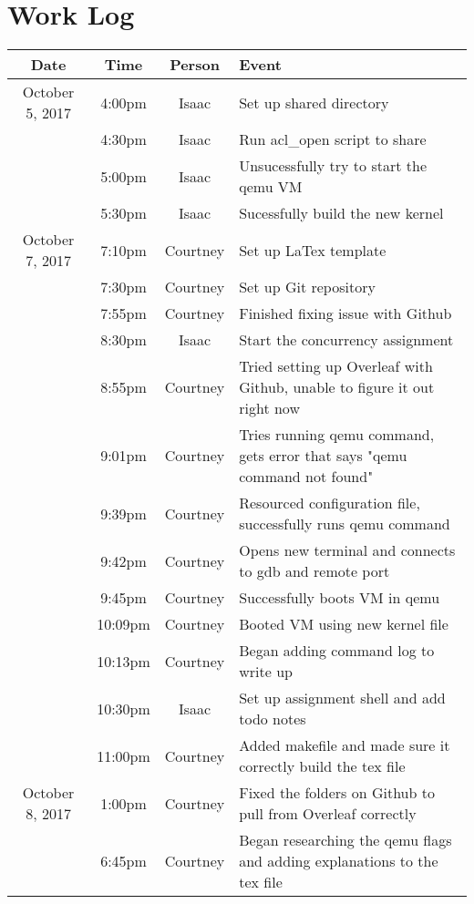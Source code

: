 \documentclass[letterpaper,10pt,draftclsnofoot,onecolumn,titlepage]{IEEEtran}
\begin{document}
\section{Work Log}
\begin{center}
\begin{tabular}{ c c c l }
 Date  & Time & Person & Event \\ \hline
 October 5, 2017 & 4:00pm & Isaac & Set up shared directory \\
                 & 4:30pm & Isaac & Run acl\_open script to share \\
                 & 5:00pm & Isaac & Unsucessfully try to start the qemu VM \\
                 & 5:30pm & Isaac & Sucessfully build the new kernel \\ \hline
 October 7, 2017 & 7:10pm & Courtney & Set up LaTex template \\  
 		 & 7:30pm & Courtney & Set up Git repository \\
                 & 7:55pm & Courtney & Finished fixing issue with Github \\
                 & 8:30pm & Isaac & Start the concurrency assignment \\
		 & 8:55pm & Courtney & Tried setting up Overleaf with Github, unable to figure it out right now \\
                 & 9:01pm & Courtney & Tries running qemu command, gets error that says "qemu command not found" \\
                 & 9:39pm & Courtney & Resourced configuration file, successfully runs qemu command \\
                 & 9:42pm & Courtney & Opens new terminal and connects to gdb and remote port \\
                 & 9:45pm & Courtney & Successfully boots VM in qemu \\
                 & 10:09pm & Courtney & Booted VM using new kernel file \\
                 & 10:13pm & Courtney & Began adding command log to write up\\
		 & 10:30pm & Isaac & Set up assignment shell and add todo notes \\
                 & 11:00pm & Courtney & Added makefile and made sure it correctly build the tex file \\ \hline
 October 8, 2017 & 1:00pm & Courtney & Fixed the folders on Github to pull from Overleaf correctly \\
 		 & 6:45pm & Courtney & Began researching the qemu flags and adding explanations to the tex file \\

\end{tabular}
\end{center}
\end{document}
